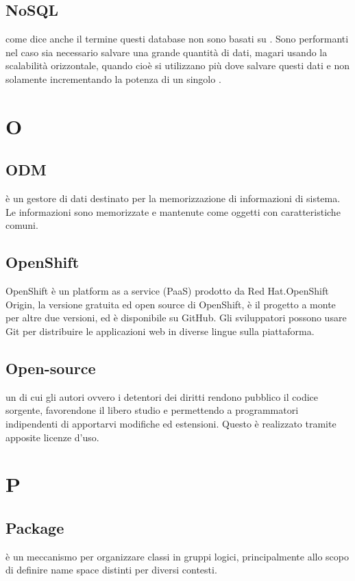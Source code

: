 \documentclass[12pt,a4paper]{article}
\begin{document}
\subsection{NoSQL} 
 come dice anche il termine questi database non sono basati su . Sono performanti nel caso sia necessario salvare una grande quantità di dati, magari usando la scalabilità orizzontale, quando cioè si utilizzano più  dove salvare questi dati e non solamente incrementando la potenza di un singolo .


\newpage

\section{O}

\subsection{ODM} 
è un gestore di dati destinato per la memorizzazione di informazioni di sistema. Le informazioni sono memorizzate e mantenute come oggetti con caratteristiche comuni.

\subsection{OpenShift}
OpenShift è un platform as a service (PaaS) prodotto da Red Hat.OpenShift Origin, la versione gratuita ed open source di OpenShift, è il progetto a monte per altre due versioni, ed è disponibile su GitHub. Gli sviluppatori possono usare Git per distribuire le applicazioni web in diverse lingue sulla piattaforma.

\subsection{Open-source} 
 un  di cui gli autori ovvero i detentori dei diritti rendono pubblico il codice sorgente, favorendone il libero studio e permettendo a programmatori indipendenti di apportarvi modifiche ed estensioni. Questo è realizzato tramite apposite licenze d'uso.

\newpage

\section{P}

\subsection{Package} 
è un meccanismo per organizzare classi  in gruppi logici, principalmente allo scopo di definire name space distinti per diversi contesti.
\end{document}

